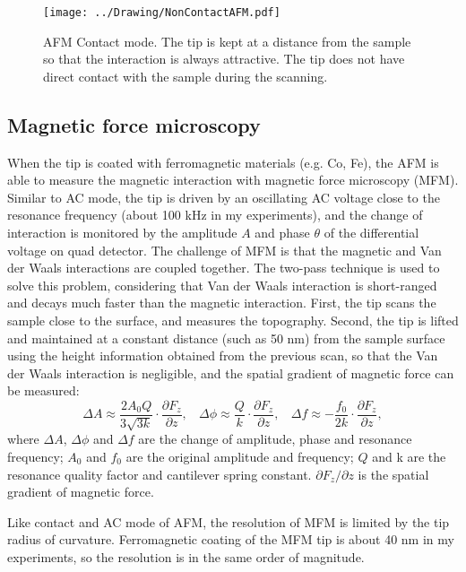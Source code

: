 \documentclass[pdftex, sectionletters]{pittetd}    %
\begin{document}
\begin{figure}[h!]
	\centering
	\texttt{[image: ../Drawing/NonContactAFM.pdf]}
	\caption{AFM Contact mode. The tip is kept at a distance from the sample so that the interaction is always attractive. The tip does not have direct contact with the sample during the scanning.}
	\label{FIG:NonContactAFM}
\end{figure}

\subsection{Magnetic force microscopy}

When the tip is coated with ferromagnetic materials (e.g. Co, Fe), the AFM is able to measure the magnetic interaction with magnetic force microscopy (MFM). Similar to AC mode, the tip is driven by an oscillating AC voltage close to the resonance frequency (about 100 kHz in my experiments), and the change of interaction is monitored by the amplitude $A$ and phase $\theta$ of the differential voltage on quad detector. The challenge of MFM is that the magnetic and Van der Waals interactions are coupled together. The two-pass technique is used to solve this problem, considering that Van der Waals interaction is short-ranged and decays much faster than the magnetic interaction. First, the tip scans the sample close to the surface, and measures the topography. Second, the tip is lifted and maintained at a constant distance (such as 50 nm) from the sample surface using the height information obtained from the previous scan, so that the Van der Waals interaction is negligible, and the spatial gradient of magnetic force can be measured\cite{hartmann1999magnetic}:
\begin{equation}
\label{EQN:MFM}
\Delta A \approx \frac{2 A_0 Q}{3\sqrt{3k}} \cdot \frac{\partial F_z}{\partial z}, \ \ \ \
\Delta \phi \approx \frac{Q}{k} \cdot \frac{\partial F_z}{\partial z}, \ \ \ \
\Delta f \approx -\frac{f_0}{2k} \cdot \frac{\partial F_z}{\partial z}, 
\end{equation}
where $\Delta A$, $\Delta \phi$ and $\Delta f$ are the change of amplitude, phase and resonance frequency; $A_0$ and $f_0$ are the original amplitude and frequency; $Q$ and k are the resonance quality factor and cantilever spring constant. $\partial F_z/\partial z$ is the spatial gradient of magnetic force. 

Like contact and AC mode of AFM, the resolution of MFM is limited by the tip radius of curvature. Ferromagnetic coating of the MFM tip is about 40 nm in my experiments, so the resolution is in the same order of magnitude. 
\end{document}
